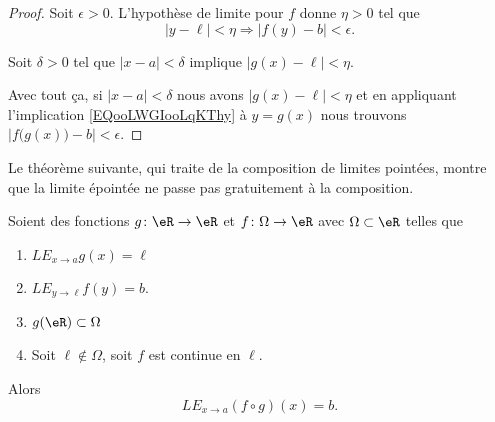 \begin{proof}
    Soit \( \epsilon>0\). L'hypothèse de limite pour \( f\) donne \( \eta>0\) tel que 
    \begin{equation}        \label{EQooLWGIooLqKThy}
        | y-\ell |<\eta \Rightarrow | f(y)-b |<\epsilon.
    \end{equation}

    Soit \( \delta>0\) tel que \( | x-a |<\delta\) implique \( | g(x)-\ell |<\eta\).

    Avec tout ça, si \( | x-a |<\delta\) nous avons \( | g(x)-\ell |<\eta\) et en appliquant l'implication \eqref{EQooLWGIooLqKThy} à \( y=g(x)\) nous trouvons \( | f\big( g(x) \big)-b |<\epsilon\).
\end{proof}

Le théorème suivante, qui traite de la composition de limites pointées, montre que la limite épointée ne passe pas gratuitement à la composition.
\begin{theorem}     \label{THOooNPBQooEMOYpd}
    Soient des fonctions \( g\colon \eR\to \eR\) et \( f\colon \Omega\to \eR\) avec \( \Omega\subset \eR\) telles que
    \begin{enumerate}
        \item
    \( {LE}_{x\to a}g(x)=\ell\) 
        \item
        \( {LE}_{y\to \ell}f(y)=b\).
    \item
        \( g(\eR)\subset \Omega\)
    \item       \label{ITEMooUNJAooCDOKcO}
        Soit \( \ell\notin \Omega\), soit \( f\) est continue en \( \ell\).
    \end{enumerate}
    Alors
    \begin{equation}        \label{EQooTHTVooCvrFdN}
        {LE}_{x\to a}(f\circ g)(x)=b.
    \end{equation}
\end{theorem}

